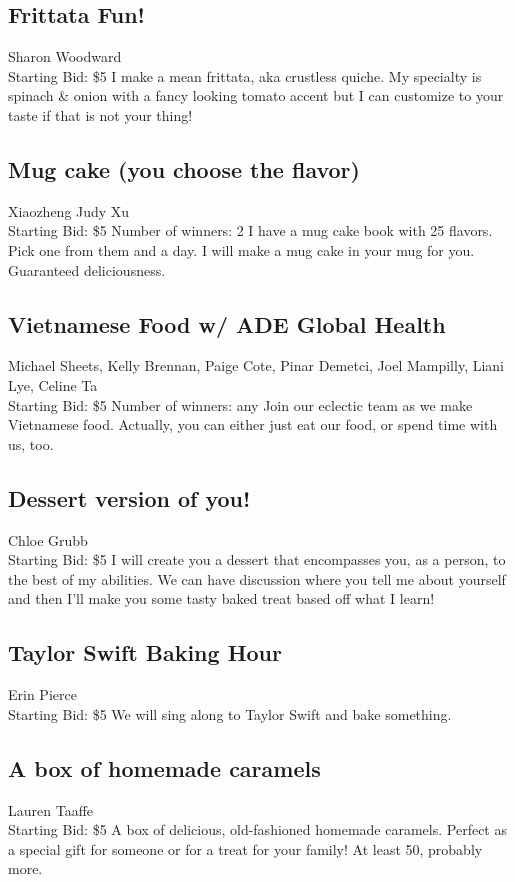 \documentclass[11pt]{article}
\begin{document}
\subsection{Frittata Fun!}
Sharon Woodward
\\
Starting Bid: \$5
\newline
I make a mean frittata, aka crustless quiche. My specialty is spinach \& onion with a fancy looking tomato accent but I can customize to your taste if that is not your thing!
\subsection{Mug cake (you choose the flavor)}
Xiaozheng Judy Xu
\\
Starting Bid: \$5
\newline
Number of winners: 2
\newline
I have a mug cake book with 25 flavors. Pick one from them and a day. I will make a mug cake in your mug for you. Guaranteed deliciousness.
\subsection{Vietnamese Food w/ ADE Global Health}
Michael Sheets, Kelly Brennan, Paige Cote, Pinar Demetci, Joel Mampilly, Liani Lye, Celine Ta
\\
Starting Bid: \$5
\newline
Number of winners: any
\newline
Join our eclectic team as we make Vietnamese food.  Actually, you can either just eat our food, or spend time with us, too.
\subsection{Dessert version of you!}
Chloe Grubb
\\
Starting Bid: \$5
\newline
I will create you a dessert that encompasses you, as a person, to the best of my abilities. We can have  discussion where you tell me about yourself and then I'll make you some tasty baked treat based off what I learn!
\subsection{Taylor Swift Baking Hour}
Erin Pierce
\\
Starting Bid: \$5
\newline
We will sing along to Taylor Swift and bake something.
\subsection{A box of homemade caramels}
Lauren Taaffe
\\
Starting Bid: \$5
\newline
A box of delicious, old-fashioned homemade caramels. Perfect as a special gift for someone or for a treat for your family! At least 50, probably more.
\end{document}
